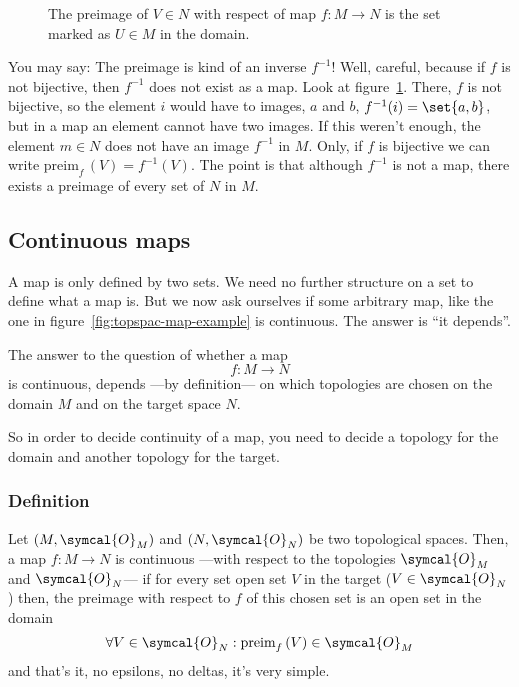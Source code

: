 \begin{figure}[ht]
    \caption{The preimage of $V\in N$ with respect of map $f:M\rightarrow N$ is the set marked
      as $U\in M$ in the domain.}
    \label{fig:topspac-preimagefV}
  \end{figure}

  You may say: The preimage is kind of an inverse $f^{-1}$!
  Well, careful, because if $f$ is not bijective, then $f^{-1}$ does not exist as a map. Look at
  figure~\ref{fig:topspac-preimagefV}. There, $f$ is not bijective, so the element $i$ would have
  to images, $a$ and $b$, $f^{-1}(i) = \set{a, b}$, but in a map an element cannot have two images.
  If this weren't enough, the element $m\in N$ does not have an image $f^{-1}$ in $M$.
  Only, if $f$ is bijective we can write $\text{preim}_f\,(V) = f^{-1}(V)$.
  The point is that although $f^{-1}$ is not a map, there exists a preimage of every set of $N$ in
  $M$.
  
  \subsection{Continuous maps}
  A map is only defined by two sets. We need no further structure on a set to define what a map is.
  But we now ask ourselves if some arbitrary map, like the one in
  figure~\ref{fig:topspac-map-example} is continuous. The answer is ``it depends''.

  The answer to the question of whether a map
  \[f: M\longrightarrow N\]
  is continuous, depends ---by definition--- on which topologies are chosen on the domain $M$ and
  on the target space $N$.

  So in order to decide continuity of a map, you need to decide a topology for the domain and
  another topology for the target.

  \subsubsection{Definition}
  Let $(M,\symcal{O}_M)$ and $(N,\symcal{O}_N)$ be two topological spaces.
  Then, a map $f:M\longrightarrow N$
  is continuous ---with respect to the topologies $\symcal{O}_M$ and $\symcal{O}_N$--- if for every
  set open set $V$ in the target\footnotemark{} ($V\in\symcal{O}_N$) then,
  the preimage with respect to $f$ of this chosen set is an open set in the domain
  \[
    \forall V\in\symcal{O}_N : \text{preim}_f\,(V) \in \symcal{O}_M
  \]
  and that's it, no epsilons, no deltas, it's very simple.

